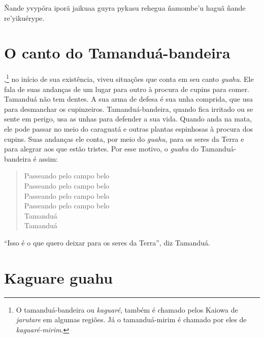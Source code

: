 Ñande yvypóra iporã jaikuaa guyra pykasu rehegua ñamombe'u haguã ñande
re'yikuérype.

\chapter{O canto do Tamanduá-bandeira}
,\footnote{O tamanduá-bandeira ou \textit{kaguaré}, também é chamado pelos Kaiowa de \textit{jarutare} em algumas regiões. Já o tamanduá-mirim é
  chamado por eles de \textit{kaguaré-mirim}.} no início de sua existência, viveu situações que conta em seu canto \textit{guahu}. Ele fala de suas andanças de um lugar para outro à procura de cupins para comer. Tamanduá não tem dentes. A sua arma de defesa é sua unha comprida, que usa para
desmanchar os cupinzeiros. Tamanduá-bandeira, quando fica irritado ou se
sente em perigo, usa as unhas para defender a sua vida. Quando anda na
mata, ele pode passar no meio do caraguatá e outras plantas espinhosas à
procura dos cupins. Suas andanças ele conta, por meio do \textit{guahu},
para os seres da Terra e para alegrar aos que estão tristes. Por esse
motivo, o \textit{guahu} do Tamanduá-bandeira é assim:

\begin{verse}
Passeando\footnotemark{} pelo campo belo\\
Passeando pelo campo belo\\
Passeando pelo campo belo\\
Passeando pelo campo belo\\
Tamanduá\\
Tamanduá
\end{verse}

``Isso é o que quero deixar para os seres da Terra'', diz Tamanduá.


\chapter{Kaguare guahu}

